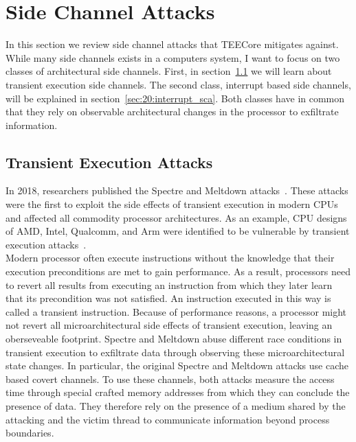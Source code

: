 \section{Side Channel Attacks}
\label{sec:20:attacks}
In this section we review side channel attacks that TEECore mitigates
against. While many side channels exists in a computers system, I want to focus
on two classes of architectural side channels. First, in
section~\ref{sec:20:transientattacks} we will learn about transient execution
side channels. The second class, interrupt based side channels, will be
explained in section~\ref{sec:20:interrupt_sca}. Both classes have in common
that they rely on observable architectural changes in the processor to
exfiltrate information.

\subsection{Transient Execution Attacks}
\label{sec:20:transientattacks}
In 2018, researchers published the Spectre and Meltdown
attacks~\cite{Kocher2018spectre, lipp_meltdown_2020}. These attacks were the
first to exploit the side effects of transient execution in modern CPUs and
affected all commodity processor architectures. As an example, CPU designs of
AMD, Intel, Qualcomm, and Arm were identified to be vulnerable by transient
execution
attacks~\cite{wikner2022retbleed,moghimi2023downfall,ragab_ghostrace_2024}.\\

Modern processor often execute instructions without the knowledge that their
execution preconditions are met to gain performance. As a result, processors
need to revert all results from executing an instruction from which they later
learn that its precondition was not satisfied. An instruction executed in this
way is called a transient instruction. Because of performance reasons, a
processor might not revert all microarchitectural side effects of transient
execution, leaving an oberseveable footprint. Spectre and Meltdown abuse
different race conditions in transient execution to exfiltrate data through
observing these microarchitectural state changes. In particular, the original
Spectre and Meltdown attacks use cache based covert channels. To use these
channels, both attacks measure the access time through special crafted memory
addresses from which they can conclude the presence of data. They therefore rely
on the presence of a medium shared by the attacking and the victim thread to
communicate information beyond process boundaries. \\

